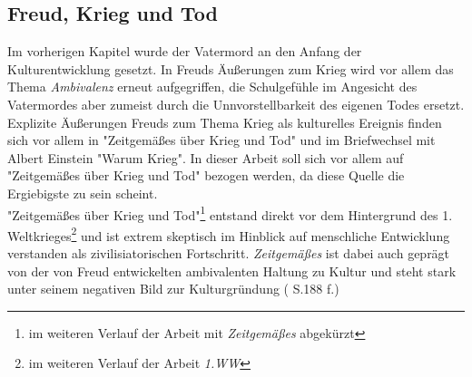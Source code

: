 \documentclass[11pt,a4paper,oneside,numbers=noenddot,bibliography=totocnumbered,DIV=13]{scrartcl}
\begin{document}
{\subsection{Freud, Krieg und Tod}
Im vorherigen Kapitel wurde der Vatermord an den Anfang der Kulturentwicklung gesetzt. In Freuds Äußerungen zum Krieg wird vor allem das Thema \textit{Ambivalenz} erneut aufgegriffen, die Schulgefühle im Angesicht des Vatermordes aber zumeist durch die Unnvorstellbarkeit des eigenen Todes ersetzt.\\
Explizite Äußerungen Freuds zum Thema Krieg als kulturelles Ereignis finden sich vor allem in "Zeitgemäßes über Krieg und Tod" und im Briefwechsel mit Albert Einstein "Warum Krieg". In dieser Arbeit soll sich vor allem auf "Zeitgemäßes über Krieg und Tod" bezogen werden, da diese Quelle die Ergiebigste zu sein scheint.\\
"Zeitgemäßes über Krieg und Tod"\footnote{im weiteren Verlauf der Arbeit mit \textit{Zeitgemäßes} abgekürzt} entstand direkt vor dem Hintergrund des 1. Weltkrieges\footnote{im weiteren Verlauf der Arbeit \textit{1.WW}} und ist extrem skeptisch im Hinblick auf menschliche Entwicklung verstanden als zivilisiatorischen Fortschritt. \textit{Zeitgemäßes} ist dabei auch geprägt von der von Freud entwickelten ambivalenten Haltung zu Kultur und steht stark unter seinem negativen Bild zur Kulturgründung (\cite{lohmann_freud-handbuch:_2013} S.188 f.)
}
\end{document}
